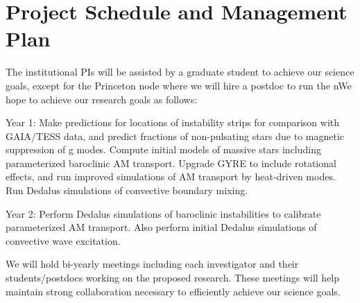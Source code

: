 \section{Project Schedule and Management Plan}

The institutional PIs will be assisted by a graduate student to achieve our science goals, except for the Princeton node where we will hire a postdoc to run the nWe hope to achieve our research goals as follows:

Year 1: Make predictions for locations of instability strips for comparison with GAIA/TESS data, and predict fractions of non-pulsating stars due to magnetic suppression of g modes. Compute initial models of massive stars including parameterized baroclinic AM transport. Upgrade GYRE to include rotational effects, and run improved simulations of AM transport by heat-driven modes. Run Dedalus simulations of convective boundary mixing.

Year 2: Perform Dedalus simulations of baroclinic instabilities to calibrate parameterized AM transport. Also perform initial Dedalus simulations of convective wave excitation. 

We will  hold bi-yearly meetings including each investigator and their students/postdocs working on the proposed research. These meetings will help maintain strong collaboration necessary to efficiently achieve our science goals.
